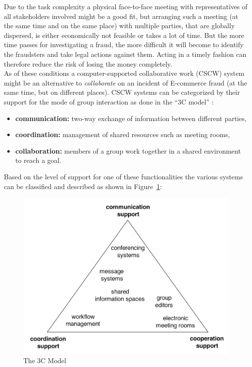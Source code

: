 Due to the task complexity a physical face-to-face meeting with representatives of all stakeholders involved might be a good fit, but arranging such a meeting (at the same time and on the same place) with multiple parties, that are globally dispersed, is either economically not feasible or takes a lot of time. But the more time passes for investigating a fraud, the more difficult it will become to identify the fraudsters and take legal actions against them. Acting in a timely fashion can therefore reduce the risk of losing the money completely. \\

As of these conditions a computer-supported collaborative work (\gls{CSCW}) system might be an alternative to \emph{collaborate} on an incident of \gls{E-commerce} fraud (at the same time, but on different places). \gls{CSCW} systems can be categorized by their support for the mode of group interaction as done in the ``3C model'' \citep{Koch2008}: \@

\begin{itemize}
    \item\textbf{communication:} two-way exchange of information between different parties,
    \item\textbf{coordination:} management of shared resources such as meeting rooms,
    \item\textbf{collaboration:} members of a group work together in a shared environment to reach a goal.
\end{itemize}

Based on the level of support for one of these functionalities the various systems can be classified and described as shown in Figure~\ref{fig:images_3C_model}: \@

\begin{figure}[H]
	\centering
		\includegraphics[width=0.9\columnwidth]{images/3C-model.png}
	\caption[The 3C Model]{The 3C Model \citep{Koch2008}}
\label{fig:images_3C_model}
\end{figure}

